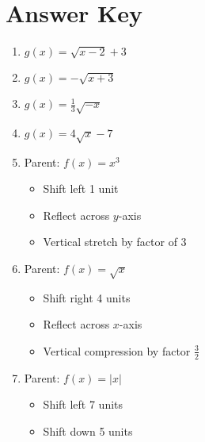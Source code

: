 \newpage

\section{Answer Key}

\begin{enumerate}
	\item $g(x) = \sqrt{x-2}+3$
	\item $g(x) = -\sqrt{x+3}$
	\item $g(x) = \frac{1}{3}\sqrt{-x}$
	\item $g(x) = 4\sqrt{x}-7$
	
	\item Parent: $f(x) = x^3$
    \begin{itemize}
        \item Shift left 1 unit
        \item Reflect across $y$-axis
        \item Vertical stretch by factor of 3
    \end{itemize}
    \item Parent: $f(x) = \sqrt{x}$
    \begin{itemize}
        \item Shift right 4 units
        \item Reflect across $x$-axis
        \item Vertical compression by factor $\frac{3}{2}$
    \end{itemize}
    \item Parent: $f(x) = |x|$
    \begin{itemize}
        \item Shift left 7 units
        \item Shift down 5 units
    \end{itemize}
\end{enumerate}